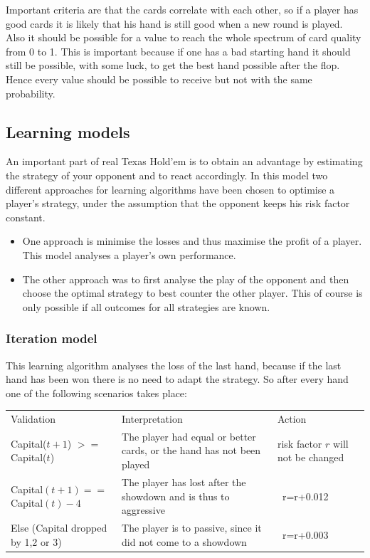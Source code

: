 \documentclass[11pt]{article}
\begin{document}
Important criteria are that the cards correlate with each other, so if a player has good cards it is likely that his hand is still good when a new round is played. Also it should be possible for a value to reach the whole spectrum of card quality from 0 to 1. This is important because if one has a bad starting hand it should still be possible, with some luck, to get the best hand possible after the flop. Hence every value should be possible to receive but not with the same probability.\\


\subsection{Learning models}
An important part of real Texas Hold’em is to obtain an advantage by estimating the strategy of your opponent and to react accordingly.
In this model two different approaches for learning algorithms have been chosen to optimise a player's strategy, under the assumption that the opponent keeps his risk factor constant.
\begin{itemize}
\item One approach is minimise the losses and thus maximise the profit of a player. This model analyses a player's own performance.
\item  The other approach was to first analyse the play of the opponent and then choose the optimal strategy to best counter the other player. This of course is only possible if all outcomes for all strategies are known.\\
\end{itemize}

\subsubsection{Iteration model}
This learning algorithm analyses the loss of the last hand, because if the last hand has been won there is no need to adapt the strategy. So after every hand one of the following scenarios takes place:\\

\renewcommand{\arraystretch}{1.4}
\begin{tabular}{ p{6.45cm}  p{5.1cm}  p{2.4cm}}
Validation & Interpretation & Action\\
\addlinespace
\hline
\hline

Capital($t+1$) $>=$ Capital($t$) &	The player had equal or better cards, or the hand has not been played&
risk factor $r$ will not be changed \\
\addlinespace
Capital$(t+1) ==$ Capital$(t)-4$	&	The player has lost after the showdown and is thus to aggressive & \ r=r+0.012\\
\addlinespace
Else (Capital dropped by 1,2 or 3) &	The player is to passive, since it did not come to a showdown & \ r=r+0.003\\
\end{tabular}
\end{document}
